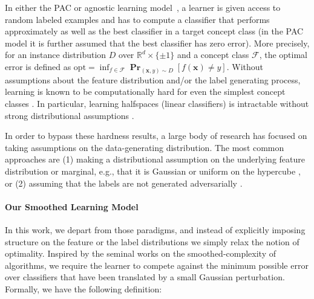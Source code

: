 \documentclass{theoretics}
\renewcommand\vec[1]{\mathbf{#1}}
\DeclareMathOperator*{\pr}{\mathbf{Pr}}
\newcommand{\R}{\mathbb{R}}
\newcommand{\opt}{\mathrm{opt}}
\newcommand{\1}{\Ind}
\newcommand{\x}{\vec x}
\begin{document}
In either the PAC or agnostic learning model~\cite{val84,Haussler:92,KSS:94}, a learner is given access to random labeled examples and has to compute a classifier that performs approximately as well as the best classifier in a target concept class (in the PAC model it is further assumed that the best classifier has zero error).  More precisely, for an instance distribution $D$ over 
$\R^d \times \{ \pm 1\}$ and a concept class $\mathcal F$, the optimal error is 
defined as $\opt = \inf_{f \in \mathcal F} \pr_{(\x, y) \sim D}[f(\x) \neq y]$.
Without assumptions about the feature distribution and/or the label generating process, learning is known to be computationally hard for even the simplest concept classes \cite{Khar1993,  GR:06,DBLP:journals/toc/Dachman-SoledLMSWW09, DBLP:journals/jcss/KhotS11, DBLP:journals/siamcomp/FeldmanGRW12,klivans2009cryptographic,DOSW:11, FLS:11colt, DanielyV21}. In particular, learning halfspaces (linear classifiers) is intractable without strong distributional assumptions \cite{KKMS:05,GR:06, Feldman:06, Daniely16}.

In order to bypass these hardness results, a large body of research has focused on taking assumptions on the data-generating distribution. 
The most common approaches are (1) making a distributional assumption on the underlying feature distribution or marginal, e.g., that it is Gaussian or uniform on the hypercube \cite{LMN:93,Long:03, KKMS:05,KOS:08, GKK:08,kalai2009learning,ABL17,DKKTZ21}, or (2) assuming that the labels are not generated adversarially  
\cite{AwasthiBHU15,AwasthiBHZ16,DGT19,DKTZ20,CKMY20,ZSA20,DKKTZ22,daniely2023computational,daniely2023most}.


\paragraph{Our Smoothed Learning Model} 
In this work, we depart from those paradigms, and instead of explicitly imposing structure 
on the feature or the label distributions we simply relax the notion of optimality.  Inspired by the seminal works \cite{spielman2004smoothed,spielman2005smoothed} on the 
smoothed-complexity of algorithms,
we require the learner to compete against
the minimum possible error over classifiers that have been translated by a small Gaussian perturbation. 
 Formally, we have the following definition:
 
\end{document}
